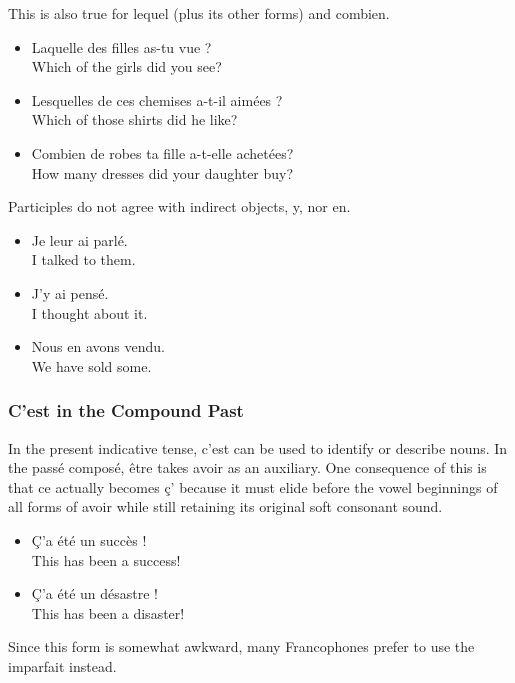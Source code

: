 This is also true for lequel (plus its other forms) and combien.

\begin{itemize}
  \item  Laquelle des filles as-tu vue ? \\ Which of the girls did you see?
	\item  Lesquelles de ces chemises a-t-il aim{\'e}es ? \\ Which of those shirts did he like?
	\item  Combien de robes ta fille a-t-elle achet{\'e}es? \\ How many dresses did your daughter buy?
\end{itemize}

Participles do not agree with indirect objects, y, nor en.

\begin{itemize}
  \item  Je leur ai parl{\'e}. \\ I talked to them.
	\item  J'y ai pens{\'e}. \\ I thought about it.
	\item  Nous en avons vendu. \\ We have sold some.
\end{itemize}

\subsubsection{C'est in the Compound Past}

In the present indicative tense, c'est can be used to identify or describe nouns. In the pass{\'e} compos{\'e}, {\^e}tre takes avoir as an auxiliary. One consequence of this is that ce actually becomes ç' because it must elide before the vowel beginnings of all forms of avoir while still retaining its original soft consonant sound.

\begin{itemize}
  \item  {\c C}'a {\'e}t{\'e} un succ{\`e}s ! \\ This has been a success!
	\item  {\c C}'a {\'e}t{\'e} un d{\'e}sastre ! \\ This has been a disaster!
\end{itemize}

Since this form is somewhat awkward, many Francophones prefer to use the imparfait instead.

